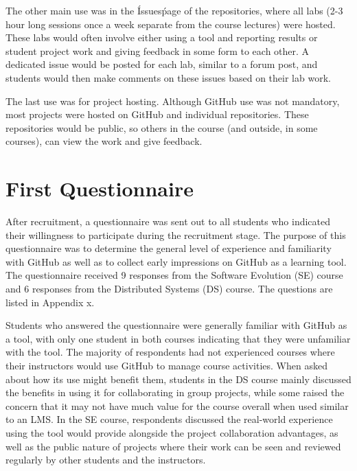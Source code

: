 The other main use was in the \'Issues\' page of the repositories, where all labs (2-3 hour long sessions once a week separate from the course lectures) were hosted. These labs would often involve either using a tool and reporting results or student project work and giving feedback in some form to each other. A dedicated issue would be posted for each lab, similar to a forum post, and students would then make comments on these issues based on their lab work.

The last use was for project hosting. Although GitHub use was not mandatory, most projects were hosted on GitHub and individual repositories. These repositories would be public, so others in the course (and outside, in some courses), can view the work and give feedback. %

\section{First Questionnaire}
After recruitment, a questionnaire was sent out to all students who indicated their willingness to participate during the recruitment stage. The purpose of this questionnaire was to determine the general level of experience and familiarity with GitHub as well as to collect early impressions on GitHub as a learning tool. The questionnaire received 9 responses from the Software Evolution (SE) course and 6 responses from the Distributed Systems (DS) course. The questions are listed in Appendix x.


Students who answered the questionnaire were generally familiar with GitHub as a tool, with only one student in both courses indicating that they were unfamiliar with the tool. The majority of respondents had not experienced courses where their instructors would use GitHub to manage course activities. When asked about how its use might benefit them, students in the DS course mainly discussed the benefits in using it for collaborating in group projects, while some raised the concern that it may not have much value for the course overall when used similar to an LMS. In the SE course, respondents discussed the real-world experience using the tool would provide alongside the project collaboration advantages, as well as the public nature of projects where their work can be seen and reviewed regularly by other students and the instructors.

